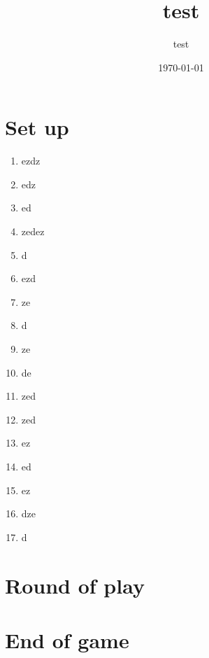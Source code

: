 \documentclass{article}%
\title{test}%
\author{test}%
\date{\today}%
\begin{document}
%
\pagestyle{empty}%
\normalsize%
\maketitle%
\section{ Set up
}%
\label{sec:Setup}%
\begin{enumerate}%
\item%
%
 ezdz
%
\item%
%
 edz
%
\item%
%
 ed
%
\item%
%
 zedez
%
\item%
%
 d
%
\item%
%
 ezd
%
\item%
%
 ze
%
\item%
%
 d
%
\item%
%
 ze
%
\item%
%
 de
%
\item%
%
 zed
%
\item%
%
 zed
%
\item%
%
 ez
%
\item%
%
 ed
%
\item%
%
 ez
%
\item%
%
 dze
%
\item%
%
 d
%
\end{enumerate}

%
\section{ Round of play
}%
\label{sec:Roundofplay}%

%
\section{ End of game}%
\label{sec:Endofgame}%

%
\end{document}
